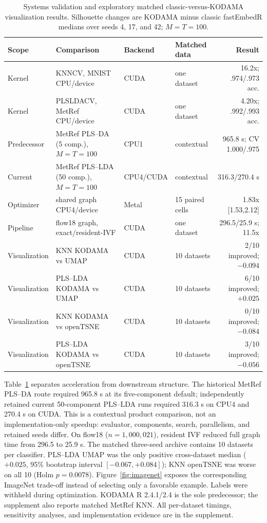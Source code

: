 \documentclass[twoside,11pt]{article}
\begin{document}
\begin{table}[h!]
\caption{Systems validation and exploratory matched classic-versus-KODAMA visualization results. Silhouette changes are KODAMA minus classic fastEmbedR medians over seeds 4, 17, and 42; $M=T=100$.}
\label{tab:validation}
\centering\scriptsize
{\setlength{\tabcolsep}{3pt}\begin{tabular}{llllr}
\toprule
Scope & Comparison & Backend & Matched data & Result \\
\midrule
Kernel & KNNCV, MNIST CPU/device & CUDA & one dataset & 16.2x; .974/.973 acc. \\
Kernel & PLSLDACV, MetRef CPU/device & CUDA & one dataset & 4.20x; .992/.993 acc. \\
Predecessor & MetRef PLS--DA (5 comp.), $M=T=100$ & CPU1 & contextual & 965.8 s; CV 1.000/.975 \\
Current & MetRef PLS--LDA (50 comp.), $M=T=100$ & CPU4/CUDA & contextual & 316.3/270.4 s \\
Optimizer & shared graph CPU4/device & Metal & 15 paired cells & 1.83x [1.53,2.12] \\
Pipeline & flow18 graph, exact/resident-IVF & CUDA & one dataset & 296.5/25.9 s; 11.5x \\
Visualization & KNN KODAMA vs UMAP & CUDA & 10 datasets & 2/10 improved; $-0.094$ \\
Visualization & PLS--LDA KODAMA vs UMAP & CUDA & 10 datasets & 6/10 improved; $+0.025$ \\
Visualization & KNN KODAMA vs openTSNE & CUDA & 10 datasets & 0/10 improved; $-0.084$ \\
Visualization & PLS--LDA KODAMA vs openTSNE & CUDA & 10 datasets & 3/10 improved; $-0.056$ \\
\bottomrule
\end{tabular}}
\end{table}

Table~\ref{tab:validation} separates acceleration from downstream structure. The historical MetRef PLS--DA route required 965.8 s at its five-component default; independently retained current 50-component PLS--LDA runs required 316.3 s on CPU4 and 270.4 s on CUDA. This is a contextual product comparison, not an implementation-only speedup: evaluator, components, search, parallelism, and retained seeds differ. On flow18 ($n=1{,}000{,}021$), resident IVF reduced full graph time from 296.5 to 25.9 s. The matched three-seed archive contains 10 datasets per classifier. PLS--LDA UMAP was the only positive cross-dataset median ($+0.025$, 95\% bootstrap interval $[-0.067,+0.084]$); KNN openTSNE was worse on all 10 (Holm $p=0.0078$). Figure~\ref{fig:imagenet} exposes the corresponding ImageNet trade-off instead of selecting only a favorable example. Labels were withheld during optimization. KODAMA R 2.4.1/2.4 is the sole predecessor; the supplement also reports matched MetRef KNN. All per-dataset timings, sensitivity analyses, and implementation evidence are in the supplement.
\end{document}
